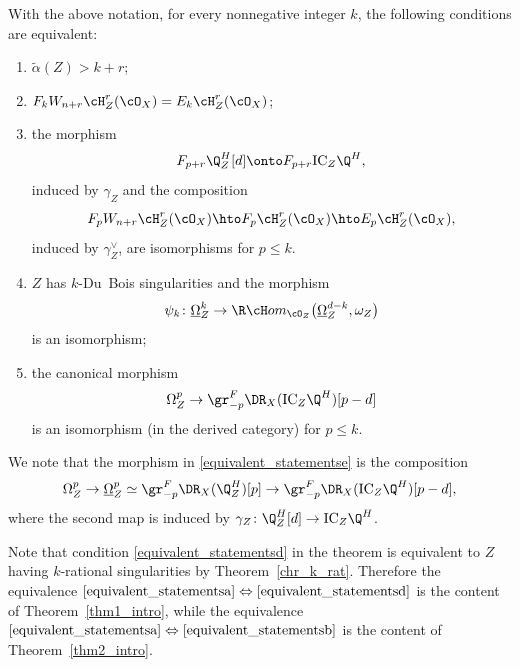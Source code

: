 \begin{thm}\label{equivalent_statements}
With the above notation, for every nonnegative integer $k$, the following conditions are equivalent:
\begin{enumerate}
\item\label{equivalent_statementsa} $\widetilde \alpha(Z)>k+r$;
\item\label{equivalent_statementsb}$F_kW_{n+r}\cH^r_Z(\cO_X)=E_k\cH^r_Z(\cO_X)$;
\item\label{equivalent_statementsc} the morphism
\begin{equation}\label{eqn1_equivalent_statements}
F_{p+r}\Q_Z^H[d]\onto F_{p+r}\mathrm{IC}_Z\Q^H,
\end{equation}
induced by $\gamma_Z$ and the composition
\begin{equation}\label{eqn2_equivalent_statements}
F_pW_{n+r}\cH^r_Z(\cO_X)\hto F_p\cH^r_Z(\cO_X)\hto E_p\cH^r_Z(\cO_X),
\end{equation}
induced by $\gamma_Z^{\vee}$, are isomorphisms for $p\leq k$.
\item\label{equivalent_statementsd} $Z$ has $k$-Du~Bois singularities and the morphism
\[
\psi_k\colon \underline{\Omega}_{Z}^k\to \R\cH om_{\cO_{Z}}\big(\underline{\Omega}_{Z}^{d-k},\omega_{Z}\big)
\]
is an isomorphism;
\item\label{equivalent_statementse} the canonical morphism
\[
\Omega^p_Z \to \gr^F_{-p}\DR_X(\mathrm{IC}_Z\Q^H)[p-d]
\]
is an isomorphism (in the derived category) for $p \leq k$.
\end{enumerate}
\end{thm}

\begin{rmk}\label{rmk_van_lci}
We note that the morphism in \eqref{equivalent_statementse} is the composition
\[\Omega_Z^p\to \underline{\Omega}_Z^p\simeq \gr^F_{-p}\DR_X(\Q_Z^H)[p]\to
\gr^F_{-p}\DR_X(\mathrm{IC}_Z\Q^H)[p-d],\]
where the second map is induced by $\gamma_Z\colon \Q_Z^H[d]\to \mathrm{IC}_Z\Q^H$.
\end{rmk}

\begin{rmk}
Note that condition
\eqref{equivalent_statementsd} in the theorem is equivalent to $Z$ having $k$-rational singularities
by Theorem~\ref{chr_k_rat}. Therefore the equivalence $\eqref{equivalent_statementsa}\Leftrightarrow\eqref{equivalent_statementsd}$ is the content of Theorem~\ref{thm1_intro},
while the equivalence $\eqref{equivalent_statementsa}\Leftrightarrow\eqref{equivalent_statementsb}$ is the content of Theorem~\ref{thm2_intro}.
\end{rmk}


